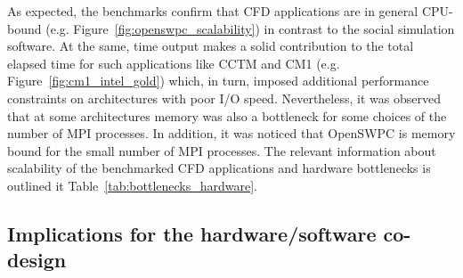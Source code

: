 As expected, the benchmarks confirm that CFD applications are in general CPU-bound (e.g. Figure~\ref{fig:openswpc_scalability}) in contrast to the social simulation software. At the same, time output makes a solid contribution to the total elapsed time for such applications like CCTM and CM1 (e.g. Figure~\ref{fig:cm1_intel_gold}) which, in turn, imposed additional performance constraints on architectures with poor I/O speed. Nevertheless, it was observed that at some architectures memory was also a bottleneck for some choices of the number of MPI processes. In addition, it was noticed that OpenSWPC is memory bound for the small number of MPI processes. The relevant information about scalability of the benchmarked CFD applications and hardware bottlenecks is outlined it Table~\ref{tab:bottlenecks_hardware}.

\subsection{Implications for the hardware/software co-design}


